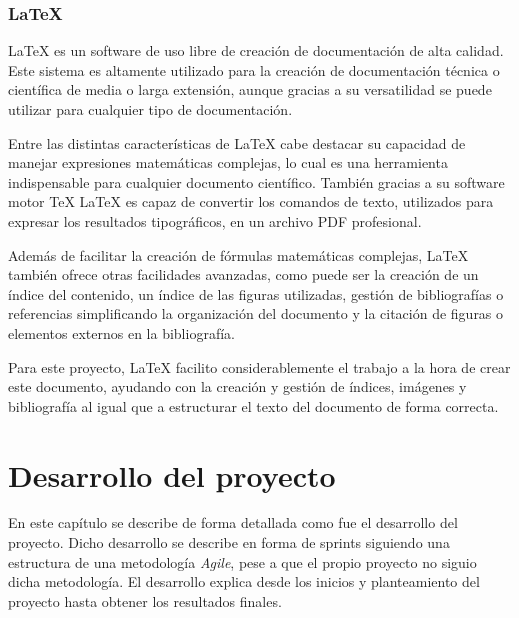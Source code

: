 \documentclass[a4paper, 12pt]{book}
\begin{document}
\subsection{LaTeX}
\label{subsec:latex}

LaTeX \cite{latexproject_about} es un software de uso libre de creación de documentación de alta calidad. Este sistema es altamente utilizado para la creación de documentación técnica o científica de media o larga extensión, aunque gracias a su versatilidad se puede utilizar para cualquier tipo de documentación.

Entre las distintas características de LaTeX cabe destacar su capacidad de manejar expresiones matemáticas complejas, lo cual es una herramienta indispensable para cualquier documento científico. También gracias a su software motor TeX LaTeX es capaz de convertir los comandos de texto, utilizados para expresar los resultados tipográficos, en un archivo PDF profesional. 

Además de facilitar la creación de fórmulas matemáticas complejas, LaTeX también ofrece otras facilidades avanzadas, como puede ser la creación de un índice del contenido, un índice de las figuras utilizadas, gestión de bibliografías o referencias simplificando la organización del documento y la citación de figuras o elementos externos en la bibliografía.

Para este proyecto, LaTeX facilito considerablemente el trabajo a la hora de crear este documento, ayudando con la creación y gestión de índices, imágenes y bibliografía al igual que a estructurar el texto del documento de forma correcta.


\cleardoublepage
\chapter{Desarrollo del proyecto}
\label{chap:Desarrollo del proyecto}
En este capítulo se describe de forma detallada como fue el desarrollo del proyecto. Dicho desarrollo
se describe en forma de sprints siguiendo una estructura de una metodología \textit{Agile}\cite{asana_agile_methodology}, pese a que el propio proyecto no siguio dicha metodología. 
El desarrollo explica desde los inicios y planteamiento del proyecto hasta obtener los resultados finales.
\end{document}
